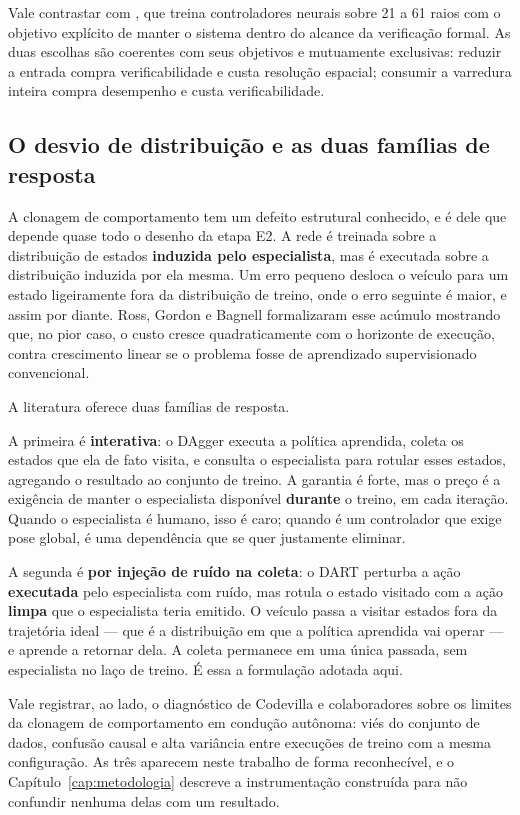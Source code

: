 Vale contrastar com \cite{Ivanov2020Verifying}, que treina controladores neurais
sobre 21 a 61 raios com o objetivo explícito de manter o sistema dentro do
alcance da verificação formal. As duas escolhas são coerentes com seus
objetivos e mutuamente exclusivas: reduzir a entrada compra verificabilidade e
custa resolução espacial; consumir a varredura inteira compra desempenho e
custa verificabilidade.

\subsection{O desvio de distribuição e as duas famílias de resposta}

A clonagem de comportamento tem um defeito estrutural conhecido, e é dele que
depende quase todo o desenho da etapa E2. A rede é treinada sobre a distribuição
de estados \textbf{induzida pelo especialista}, mas é executada sobre a
distribuição induzida por ela mesma. Um erro pequeno desloca o veículo para um
estado ligeiramente fora da distribuição de treino, onde o erro seguinte é maior,
e assim por diante. Ross, Gordon e Bagnell \cite{Ross2011DAgger} formalizaram
esse acúmulo mostrando que, no pior caso, o custo cresce quadraticamente com o
horizonte de execução, contra crescimento linear se o problema fosse de
aprendizado supervisionado convencional.

A literatura oferece duas famílias de resposta.

A primeira é \textbf{interativa}: o DAgger \cite{Ross2011DAgger} executa a
política aprendida, coleta os estados que ela de fato visita, e consulta o
especialista para rotular esses estados, agregando o resultado ao conjunto de
treino. A garantia é forte, mas o preço é a exigência de manter o especialista
disponível \textbf{durante} o treino, em cada iteração. Quando o especialista é
humano, isso é caro; quando é um controlador que exige pose global, é uma
dependência que se quer justamente eliminar.

A segunda é \textbf{por injeção de ruído na coleta}: o DART
\cite{Laskey2017DART} perturba a ação \textbf{executada} pelo especialista com
ruído, mas rotula o estado visitado com a ação \textbf{limpa} que o especialista
teria emitido. O veículo passa a visitar estados fora da trajetória ideal ---
que é a distribuição em que a política aprendida vai operar --- e aprende a
retornar dela. A coleta permanece em uma única passada, sem especialista no laço
de treino. É essa a formulação adotada aqui.

Vale registrar, ao lado, o diagnóstico de Codevilla e colaboradores
\cite{Codevilla2019Limitations} sobre os limites da clonagem de comportamento em
condução autônoma: viés do conjunto de dados, confusão causal e alta variância
entre execuções de treino com a mesma configuração. As três aparecem neste
trabalho de forma reconhecível, e o Capítulo~\ref{cap:metodologia} descreve a
instrumentação construída para não confundir nenhuma delas com um resultado.

